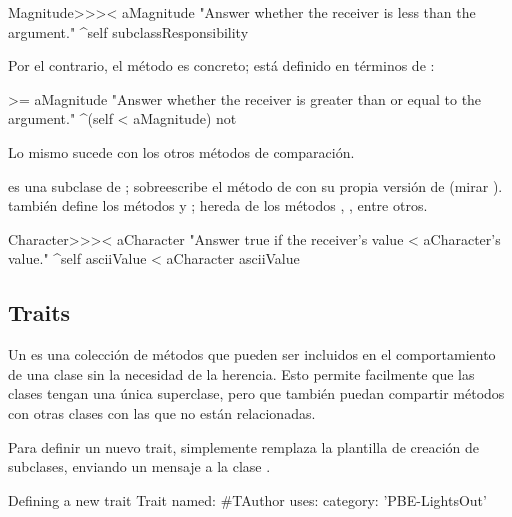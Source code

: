 \documentclass[a4paper,10pt,twoside]{book}
\begin{document}
\begin{method}[MagnitudeLessThan]{}
Magnitude>>>< aMagnitude 
	"Answer whether the receiver is less than the argument."
	^self subclassResponsibility
\end{method}

\noindent
Por el contrario, el m\'etodo  es concreto; est\'a definido en t\'erminos de \ct{<}:


\begin{method}[Magnitude>=]{}
>= aMagnitude 
	"Answer whether the receiver is greater than or equal to the argument."
	^(self < aMagnitude) not
\end{method}

Lo mismo sucede con los otros m\'etodos de comparaci\'on.

 es una subclase de ; sobreescribe el m\'etodo  de \ct{<} con su propia versi\'on de \ct{<} (mirar ).   tambi\'en define los m\'etodos \ct{=} y ; hereda de  los m\'etodos \ct{>=}, \ct{<=}, \ct{~=} entre otros.


\begin{method}[CharacterLessThan]{}
Character>>>< aCharacter 
	"Answer true if the receiver's value < aCharacter's value."
	^self asciiValue < aCharacter asciiValue
\end{method}



\subsection{Traits}
Un  es una colecci\'on de m\'etodos que pueden ser incluidos en el comportamiento de una clase sin la necesidad de la herencia. Esto permite facilmente que las clases tengan una \'unica superclase, pero que tambi\'en puedan compartir m\'etodos con otras clases con las que no est\'an relacionadas.

Para definir un nuevo trait, simplemente remplaza la plantilla de creaci\'on de subclases, enviando un mensaje a la clase .

\begin{classdef}[tauthor]{Defining a new trait}
Trait named: #TAuthor
	uses: { }
	category: 'PBE-LightsOut'
\end{classdef}
\end{document}
